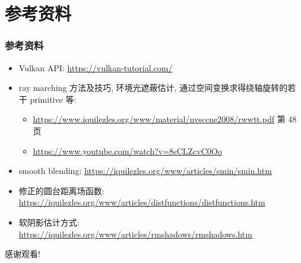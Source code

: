 \documentclass[aspectratio=169]{ctexbeamer} %
\begin{document}
\section{参考资料}
\begin{frame}
    \frametitle{参考资料}
    \begin{itemize}
        \item Vulkan API: \url{https://vulkan-tutorial.com/}
        \item ray marching 方法及技巧, 环境光遮蔽估计, 通过空间变换求得绕轴旋转的若干 primitive 等:
        \begin{itemize}
            \item \url{https://www.iquilezles.org/www/material/nvscene2008/rwwtt.pdf} 第 48 页
            \item \url{https://www.youtube.com/watch?v=8sCLZcvC0Oo}
        \end{itemize}
        \item smooth blending: \url{https://iquilezles.org/www/articles/smin/smin.htm}
        \item 修正的圆台距离场函数: \url{https://iquilezles.org/www/articles/distfunctions/distfunctions.htm}
        \item 软阴影估计方式: \url{https://iquilezles.org/www/articles/rmshadows/rmshadows.htm}
    \end{itemize}
\end{frame}

\begin{frame}
    \begin{center}
        \Huge{感谢观看!}
    \end{center}
\end{frame}
\end{document}
